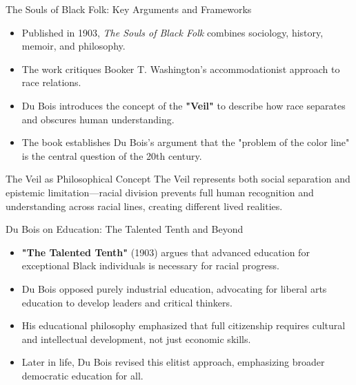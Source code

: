 \documentclass{beamer}
\begin{document}
	\begin{frame}{The Souls of Black Folk: Key Arguments and Frameworks}
		\begin{itemize}
			\item Published in 1903, \textit{The Souls of Black Folk} combines sociology, history, memoir, and philosophy.
			\item The work critiques Booker T. Washington's accommodationist approach to race relations.
			\item Du Bois introduces the concept of the \textbf{"Veil"} to describe how race separates and obscures human understanding.
			\item The book establishes Du Bois's argument that the "problem of the color line" is the central question of the 20th century.
		\end{itemize}
		
		\begin{exampleblock}{The Veil as Philosophical Concept}
			The Veil represents both social separation and epistemic limitation—racial division prevents full human recognition and understanding across racial lines, creating different lived realities.
		\end{exampleblock}
	\end{frame}
	
	\begin{frame}{Du Bois on Education: The Talented Tenth and Beyond}
		\begin{itemize}
			\item \textbf{"The Talented Tenth"} (1903) argues that advanced education for exceptional Black individuals is necessary for racial progress.
			\item Du Bois opposed purely industrial education, advocating for liberal arts education to develop leaders and critical thinkers.
			\item His educational philosophy emphasized that full citizenship requires cultural and intellectual development, not just economic skills.
			\item Later in life, Du Bois revised this elitist approach, emphasizing broader democratic education for all.
		\end{itemize}
		
	\end{frame}
	
\end{document}
